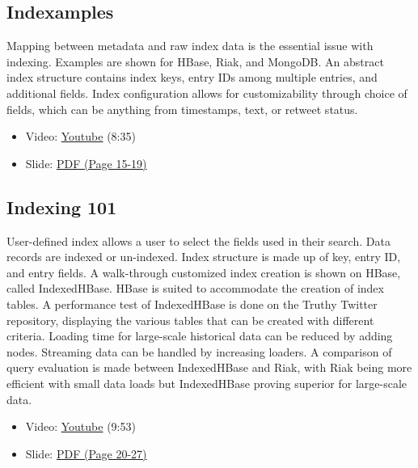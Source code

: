 \subsection{Indexamples}\label{indexamples}

Mapping between metadata and raw index data is the essential issue with
indexing. Examples are shown for HBase, Riak, and MongoDB. An abstract
index structure contains index keys, entry IDs among multiple entries,
and additional fields. Index configuration allows for customizability
through choice of fields, which can be anything from timestamps, text,
or retweet status.

\begin{itemize}

\item
  Video: \href{https://www.youtube.com/watch?v=Ec3VFeTGuo8}{Youtube}
  (8:35)
\item
  Slide:
  \href{https://drive.google.com/open?id=0B88HKpainTSfWUh6dVNHcXloSnc}{PDF
  (Page 15-19)}
\end{itemize}

\subsection{Indexing 101}\label{indexing-101}

User-defined index allows a user to select the fields used in their
search. Data records are indexed or un-indexed. Index structure is made
up of key, entry ID, and entry fields. A walk-through customized index
creation is shown on HBase, called IndexedHBase. HBase is suited to
accommodate the creation of index tables. A performance test of
IndexedHBase is done on the Truthy Twitter repository, displaying the
various tables that can be created with different criteria. Loading time
for large-scale historical data can be reduced by adding nodes.
Streaming data can be handled by increasing loaders. A comparison of
query evaluation is made between IndexedHBase and Riak, with Riak being
more efficient with small data loads but IndexedHBase proving superior
for large-scale data.

\begin{itemize}

\item
  Video: \href{https://www.youtube.com/watch?v=eKQaLkw-HBU}{Youtube}
  (9:53)
\item
  Slide:
  \href{https://drive.google.com/open?id=0B88HKpainTSfWUh6dVNHcXloSnc}{PDF
  (Page 20-27)}
\end{itemize}

